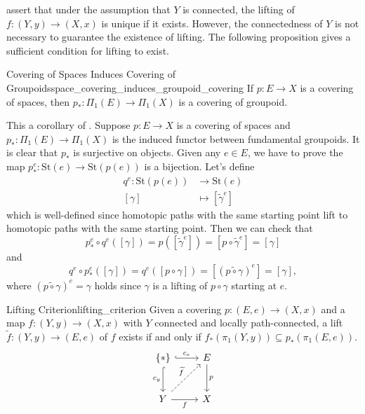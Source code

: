 \documentclass{report}
\begin{document}
 assert that under the assumption that $Y$ is connected, the lifting of $f:(Y,y)\to(X,x)$ is unique if it exists. However, the connectedness of $Y$ is not necessary to guarantee the existence of lifting. The following proposition gives a sufficient condition for lifting to exist.


\begin{corollary}{Covering of Spaces Induces Covering of Groupoids}{space_covering_induces_groupoid_covering}
	If $p : E \to X$ is a covering of spaces, then $p_*: \Pi_1(E) \to \Pi_1(X)$ is a covering of groupoid.
\end{corollary}

\begin{prf}
	This a corollary of . Suppose $p : E \to X$ is a covering of spaces and $p_*: \Pi_1(E) \to \Pi_1(X)$ is the induced functor between fundamental groupoids. It is clear that $p_*$ is surjective on objects. Given any $e\in E$,	we have to prove the map $p_*^{e}:\mathrm{St}(e)\to\mathrm{St}(p(e))$ is a bijection. Let's define
	\begin{align*}
		q^e:\mathrm{St}(p(e))&\to \mathrm{St}(e)\\
		[\gamma]&\mapsto [\widetilde{\gamma}^e]
	\end{align*}
	which is well-defined since homotopic paths with the same starting point lift to homotopic paths with the same starting point. Then we can check that
	\[
		p_*^{e}\circ q^e([\gamma])=p([\widetilde{\gamma}^e])=[p\circ\widetilde{\gamma}^e]=[\gamma]
	\]
	and
	\[
		q^e\circ p_*^{e}([\gamma])=q^e([p\circ\gamma])=\left[\left(\widetilde{p\circ\gamma}\right)^e\right]=[\gamma],
	\]
	where $\left(\widetilde{p\circ\gamma}\right)^e=\gamma$ holds since $\gamma$ is a lifting of $p\circ\gamma$ starting at $e$.
\end{prf}


\begin{proposition}{Lifting Criterion}{lifting_criterion}
	Given a covering $p:\left(E, e\right) \rightarrow\left(X, x\right)$ and a map $f:\left(Y, y\right) \rightarrow\left(X, x\right)$ with $Y$ connected and locally path-connected, a lift $\widetilde{f}:\left(Y, y\right) \rightarrow\left(E, e\right)$ of $f$ exists if and only if $f_*\left(\pi_1\left(Y, y\right)\right) \subseteq p_*\left(\pi_1\left(E, e\right)\right)$.
	\[
	\begin{tikzcd}[ampersand replacement=\&]
		\{*\} \arrow[r, "c_e",hook] \arrow[d, "c_y"', hook]                      \& E \arrow[d, "p"] \\ [+8pt]
		Y \arrow[r, "f"'] \arrow[ru, "\widetilde{f}", dashed] \& X               
	\end{tikzcd}
	\]
\end{proposition}
\end{document}
